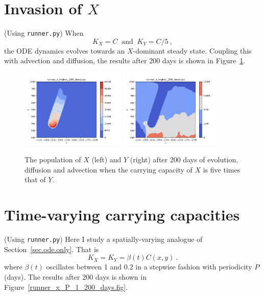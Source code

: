 \documentclass{article}
\begin{document}
\section{Invasion of $X$}

(Using {\tt runner.py})  When
\begin{equation}
  K_{X} = C \ \mbox{ and }\ K_{Y} = C/5 \ ,
\end{equation}
the ODE dynamics evolves towards an $X$-dominant steady state.  Coupling this with advection and diffusion, the results after 200 days is shown in Figure~\ref{runner_x_highcc_200_days.fig}.

\begin{figure}[htb]
  \centering
  \includegraphics[width=5cm]{runner_x_highcc_200_days.png} \quad
  \includegraphics[width=5cm]{runner_y_highcc_200_days.png}
  \caption{\label{runner_x_highcc_200_days.fig}The population of $X$ (left) and $Y$ (right) after 200 days of evolution, diffusion and advection when the carrying capacity of $X$ is five times that of $Y$.}
\end{figure}


\section{Time-varying carrying capacities}

(Using {\tt runner.py})  Here I study a spatially-varying analogue of Section~\ref{sec.ode.only}.  That is
\begin{equation}
  K_{X} = K_{Y} = \beta(t) C(x, y) \ .
\end{equation}
where $\beta(t)$ oscillates between 1 and 0.2 in a stepwise fashion with periodicity $P$ (days).  The results after 200 days is shown in Figure~\ref{runner_x_P_1_200_days.fig}.
\end{document}
